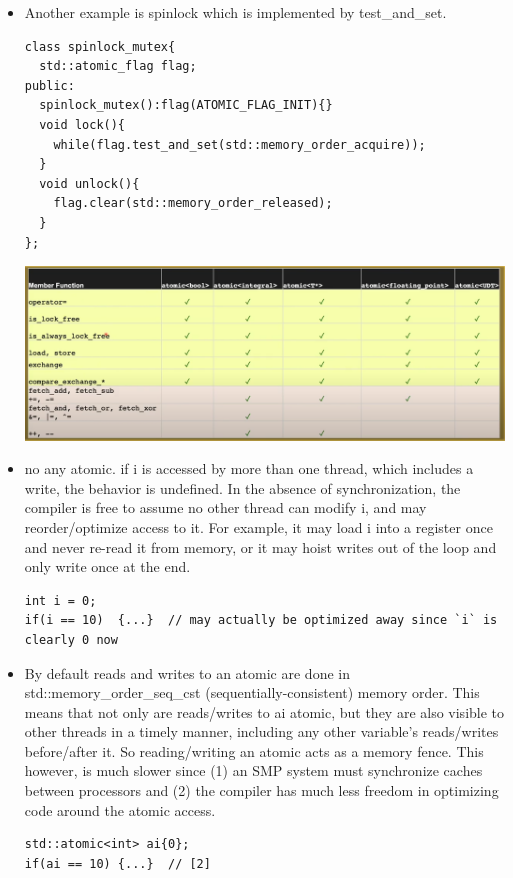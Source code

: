 \documentclass[a4paper,11pt,twoside]{book}
\begin{document}
\begin{itemize}
\item Another example is spinlock which is implemented by test\_and\_set.
\begin{lstlisting}
class spinlock_mutex{
  std::atomic_flag flag;
public:
  spinlock_mutex():flag(ATOMIC_FLAG_INIT){}
  void lock(){
    while(flag.test_and_set(std::memory_order_acquire));
  }
  void unlock(){
    flag.clear(std::memory_order_released);
  }
};
\end{lstlisting}


\begin{center}
	\includegraphics[width=0.90\linewidth]{pics/atomic_operator.png}
\end{center}

    \item no any atomic. if i is accessed by more than one thread, which includes a write, the behavior is undefined. In the absence of synchronization, the compiler is free to assume no other thread can modify i, and may reorder/optimize access to it. For example, it may load i into a register once and never re-read it from memory, or it may hoist writes out of the loop and only write once at the end.
\begin{lstlisting}[]
int i = 0; 
if(i == 10)  {...}  // may actually be optimized away since `i` is clearly 0 now 
\end{lstlisting}

    \item By default reads and writes to an atomic are done in std::memory\_order\_seq\_cst (sequentially-consistent) memory order. This means that not only are reads/writes to ai atomic, but they are also visible to other threads in a timely manner, including any other variable's reads/writes before/after it. So reading/writing an atomic acts as a memory fence. This however, is much slower since (1) an SMP system must synchronize caches between processors and (2) the compiler has much less freedom in optimizing code around the atomic access.

\begin{lstlisting}[]
std::atomic<int> ai{0}; 
if(ai == 10) {...}  // [2]    
\end{lstlisting}


\end{itemize}
\end{document}
